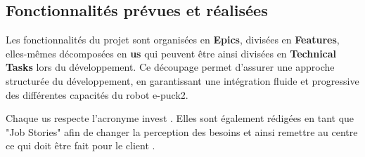 \subsection{Fonctionnalités prévues et réalisées} \label{sec:features}

Les fonctionnalités du projet sont organisées en \textbf{Epics}, divisées en \textbf{Features}, elles-mêmes décomposées en \textbf{\acrfull{us}} qui peuvent être ainsi divisées en \textbf{Technical Tasks} lors du développement.
Ce découpage permet d’assurer une approche structurée du développement, en garantissant une intégration fluide et progressive des différentes capacités du robot e-puck2.

Chaque \acrshort{us} respecte l'acronyme \acrfull{invest} \autocite{alliance_what_2015}.
Elles sont également rédigées en tant que "Job Stories" afin de changer la perception des besoins et ainsi remettre au centre ce qui doit être fait pour le client \autocite{klement_replacing_2018}.

